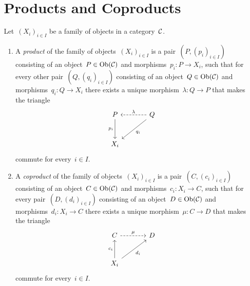 \section{Products and Coproducts}

\begin{definition}
  Let~$(X_i)_{i \in I}$ be a family of objects in a category~$\mathcal{C}$.
  \begin{enumerate}
    \item
      A \emph{product} of the family of objects~$(X_i)_{i \in I}$ is a pair~$(P, (p_i)_{i \in I})$ consisting of an object~$P \in \operatorname{Ob}(\mathcal{C})$ and morphisms~$p_i \colon P \to X_i$, such that for every other pair~$(Q, (q_i)_{i \in I})$ consisting of an object~$Q \in \operatorname{Ob}(\mathcal{C})$ and morphisms~$q_i \colon Q \to X_i$ there exists a unique morphism~$\lambda \colon Q \to P$ that makes the triangle
      \[
        \begin{tikzcd}[sep = large]
            P
            \arrow{d}[left]{p_i}
          & Q
            \arrow{dl}[below right]{q_i}
            \arrow[dashed]{l}[above]{\lambda}
          \\
            X_i
          & {}
        \end{tikzcd}
      \]
      commute for every~$i \in I$.
    \item
      A \emph{coproduct} of the family of objects~$(X_i)_{i \in I}$ is a pair~$(C, (c_i)_{i \in I})$ consisting of an object~$C \in \operatorname{Ob}(\mathcal{C})$ and morphisms~$c_i \colon X_i \to C$, such that for every pair~$(D, (d_i)_{i \in I})$ consisting of an object~$D \in \operatorname{Ob}(\mathcal{C})$ and morphisms~$d_i \colon X_i \to C$ there exists a unique morphism~$\mu \colon C \to D$ that makes the triangle
      \[
        \begin{tikzcd}[sep = large]
            C
            \arrow[dashed]{r}[above]{\mu}
          & D
          \\
            X_i
            \arrow{u}[left]{c_i}
            \arrow{ur}[below right]{d_i}
          & {}
        \end{tikzcd}
      \]
      commute for every~$i \in I$.
  \end{enumerate}
\end{definition}


